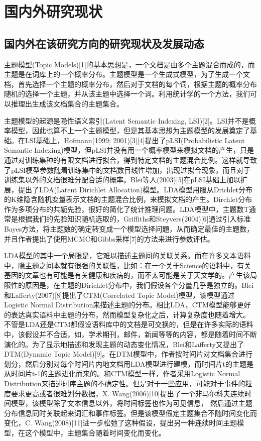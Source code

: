\chapter{国内外研究现状}
\section{国内外在该研究方向的研究现状及发展动态}
主题模型(Topic Models)[1]的基本思想是，一个文档是由多个主题混合而成的，而主题是在词库上的一个概率分布。主题模型是一个生成式模型，为了生成一个文档，首先选择一个主题的概率分布，然后对于文档的每个词，根据主题的概率分布随机的选择一个主题，并从该主题中选择一个词。利用统计学的一个方法，我们可以推理出生成该文档集合的主题集合。


主题模型的起源是隐性语义索引(Latent Semantic Indexing, LSI)[2]。LSI并不是概率模型，因此也算不上一个主题模型，但是其基本思想为主题模型的发展奠定了基础。在LSI基础上，Hofmann(1999; 2001)[3][4]提出了pLSI(Probabilistic Latent Semantic Indexing)模型，但pLSI并没有用一个概率模型来模拟文档的产生，只是通过对训练集种的有限文档进行拟合，得到特定文档的主题混合比例。这样就导致了pLSI模型参数随着训练集中的文档数目线性增加，出现过拟合现象，而且对于训练集以外的文档很难分配合适的概率。Blei等人(2003)[5]在pLSI基础上加以扩展，提出了LDA(Latent Dirichlet Allocation)模型。LDA模型用服从Drichlet分布的K维隐含随机变量表示文档的主题混合比例，来模拟文档的产生。Dirchlet分布作为多项分布的共轭先验，很好的简化了统计推理问题。LDA模型中，主题数T通常是根据我们的先验知识随机选取的，Griffiths和Steyvers(2004)[6]通过引入标准Bayes方法，将主题数的确定转变成一个模型选择问题，从而确定最佳的主题数，并且作者提出了使用MCMC和Gibbs采样[7]的方法来进行参数评估。


LDA模型的其中一个局限是，它难以描述主题间的关联关系。而在许多文本语料中，隐主题之间本就有很强的关联性，比如：在一个关于Science的语料中，有关基因的文章也有可能是有关健康和疾病的，而不太可能是关于天文学的。产生该局限性的原因是，在主题的Dirichlet分布中，我们假设各个分量几乎是独立的。Blei和Lafferty(2007)[8]提出了CTM(Correlated Topic Model)模型，该模型通过Logistic Normal Distribution来描述主题的分布。相比LDA，CTM模型能够更好的表达真实语料中主题的分布，然而模型复杂化之后，计算复杂度也随着增大。
不管是LDA还是CTM都假设语料库中的文档是可交换的，但是在许多实际的语料中，该假设并不合适，如，学术期刊，邮件，新闻等等的内容，都是随着时间不断演化的。为了显示地描述和发现主题的动态变化情况，Blei和Lafferty又提出了DTM(Dynamic Topic Model)[9]。在DTM模型中，作者按时间片对文档集合进行划分，然后分别对每个时间片内地文档用LDA模型进行建模，而时间片t的主题是从时间片t-1的主题进化而来的。和CTM模型一样，作者采用Logistic Normal Distribution来描述时序主题的不确定性。但是对于一些应用，可能对于事件的粒度要求更高或者很难划分数据，X. Wang(2006)[10]提出了一个非马尔科夫连续时间模型，该模型除了文本信息以外，将时间标签也作为可见信息，
然后通过主题分布信息同时关联起来词汇和事件标签。但是该模型假定主题集合不随时间变化而变化，C. Wang(2008)[11]进一步松弛了这种假设，提出另一种连续时间主题模型，在这个模型中，主题集合随着时间变化而变化。



